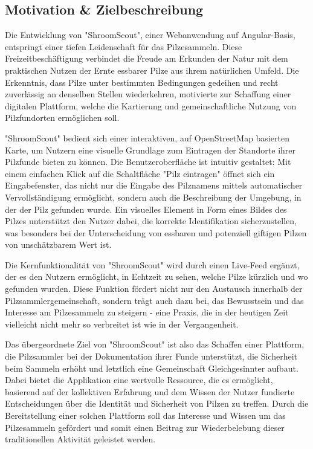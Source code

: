 \documentclass[../main.tex]{subfiles}
\begin{document}
\subsection{Motivation \& Zielbeschreibung}

Die Entwicklung von "ShroomScout", einer Webanwendung auf Angular-Basis, entspringt einer tiefen Leidenschaft 
für das Pilzesammeln. Diese Freizeitbeschäftigung verbindet die Freude am Erkunden der Natur mit dem praktischen 
Nutzen der Ernte essbarer Pilze aus ihrem natürlichen Umfeld. Die Erkenntnis, dass Pilze unter bestimmten Bedingungen 
gedeihen und recht zuverlässig an denselben Stellen wiederkehren, motivierte zur Schaffung einer digitalen Plattform, 
welche die Kartierung und gemeinschaftliche Nutzung von Pilzfundorten ermöglichen soll.

"ShroomScout" bedient sich einer interaktiven, auf OpenStreetMap basierten Karte, um Nutzern eine visuelle 
Grundlage zum Eintragen der Standorte ihrer Pilzfunde bieten zu können. Die Benutzeroberfläche ist intuitiv gestaltet: 
Mit einem einfachen Klick auf die Schaltfläche "Pilz eintragen" öffnet sich ein Eingabefenster, das nicht nur die 
Eingabe des Pilznamens mittels automatischer Vervollständigung ermöglicht, sondern auch die Beschreibung der Umgebung, 
in der der Pilz gefunden wurde. Ein visuelles Element in Form eines Bildes des Pilzes unterstützt den Nutzer dabei, 
die korrekte Identifikation sicherzustellen, was besonders bei der Unterscheidung von essbaren und potenziell giftigen 
Pilzen von unschätzbarem Wert ist.

Die Kernfunktionalität von "ShroomScout" wird durch einen Live-Feed ergänzt, der es den Nutzern ermöglicht, 
in Echtzeit zu sehen, welche Pilze kürzlich und wo gefunden wurden. Diese Funktion fördert nicht nur den 
Austausch innerhalb der Pilzsammlergemeinschaft, sondern trägt auch dazu bei, das Bewusstsein und das 
Interesse am Pilzesammeln zu steigern - eine Praxis, die in der heutigen Zeit vielleicht nicht mehr so 
verbreitet ist wie in der Vergangenheit.

Das übergeordnete Ziel von "ShroomScout" ist also das Schaffen einer Plattform, die Pilzsammler bei der Dokumentation 
ihrer Funde unterstützt, die Sicherheit beim Sammeln erhöht und letztlich eine Gemeinschaft Gleichgesinnter 
aufbaut. Dabei bietet die Applikation eine wertvolle Ressource, die es ermöglicht, basierend auf der kollektiven Erfahrung 
und dem Wissen der Nutzer fundierte Entscheidungen über die Identität und Sicherheit von Pilzen zu treffen. Durch die 
Bereitstellung einer solchen Plattform soll das Interesse und Wissen um das Pilzesammeln gefördert und somit einen Beitrag 
zur Wiederbelebung dieser traditionellen Aktivität geleistet werden.
\end{document}

